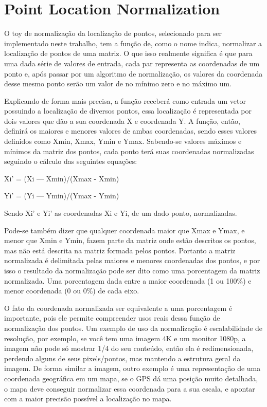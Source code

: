 \documentclass[12pt]{article}
\begin{document}
\section{Point Location Normalization}

O toy de normalização da localização de pontos, selecionado para ser implementado neste trabalho, tem a função de, como o nome indica, normalizar a localização de pontos de uma matriz. O que isso realmente significa é que para uma dada série de valores de entrada, cada par representa as coordenadas de um ponto e, após passar por um algoritmo de normalização, os valores da coordenada desse mesmo ponto serão um valor de no mínimo zero e no máximo um. 

Explicando de forma mais precisa, a função receberá como entrada um vetor possuindo a localização de diversos pontos, essa localização é representada por dois valores que dão a sua coordenada X e coordenada Y. A função, então, definirá os maiores e menores valores de ambas coordenadas, sendo esses valores definidos como Xmin, Xmax, Ymin e Ymax. Sabendo-se valores máximos e mínimos da matriz dos pontos, cada ponto terá suas coordenadas normalizadas seguindo o cálculo das seguintes equações:

\begin{equacao}

\centering Xi'    =    (Xi — Xmin)/(Xmax - Xmin)

\end{equacao}

\begin{equacao}

\centering Yi'    =    (Yi — Ymin)/(Ymax - Ymin)

\end{equacao}

Sendo Xi’ e Yi’ as coordenadas Xi e Yi, de um dado ponto, normalizadas.

Pode-se também dizer que qualquer coordenada maior que Xmax e Ymax, e menor que Xmin e Ymin, fazem parte da matriz onde estão descritos os pontos, mas não está descrita na matriz formada pelos pontos. Portanto a matriz normalizada é delimitada pelas maiores e menores coordenadas dos pontos, e por isso o resultado da normalização pode ser dito como uma porcentagem da matriz normalizada. Uma porcentagem dada entre a maior coordenada (1 ou 100\%) e menor coordenada (0 ou 0\%) de cada eixo.

O fato da coordenada normalizada ser equivalente a uma porcentagem é importante, pois ele permite compreender usos reais dessa função de normalização dos pontos. Um exemplo de uso da normalização é escalabilidade de resolução, por exemplo, se você tem uma imagem 4K e um monitor 1080p, a imagem não pode só mostrar 1/4 do seu conteúdo, então ela é redimensionada, perdendo alguns de seus pixels/pontos, mas mantendo a estrutura geral da imagem. De forma similar a imagem, outro exemplo é uma representação de uma coordenada geográfica em um mapa, se o GPS dá uma posição muito detalhada, o mapa deve conseguir normalizar essa coordenada para a sua escala, e apontar com a maior precisão possível a localização no mapa.
\end{document}
